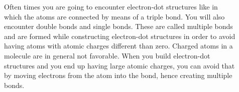 \documentclass[main.tex]{subfiles}
\begin{document}
\begin{description}
\item[] Often times you are going to encounter electron-dot structures like\hspace{.05in} \hspace{.05in} in which the atoms are connected by means of a triple bond. You will also encounter double bonds \hspace{.05in} \hspace{.05in}  and single bonds. These are called multiple bonds and are formed while constructing electron-dot structures in order to avoid having atoms with atomic charges different than zero. Charged atoms in a molecule are in general not favorable. When you build electron-dot structures and you end up having large atomic charges, you can avoid that by moving electrons from the atom into the bond, hence creating multiple bonds.




\end{description}
\end{document}
